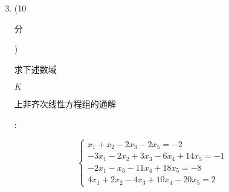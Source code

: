 \documentclass[10pt]{article}
\begin{document}
\begin{enumerate}
  \setcounter{enumi}{2}
  \item (10 \begin{CJK}{UTF8}{mj}分\end{CJK}) \begin{CJK}{UTF8}{mj}求下述数域\end{CJK} $K$ \begin{CJK}{UTF8}{mj}上非齐次线性方程组的通解\end{CJK}:
\end{enumerate}
$$
\left\{\begin{array}{l}
x_{1}+x_{2}-2 x_{3}-2 x_{5}=-2 \\
-3 x_{1}-2 x_{2}+3 x_{3}-6 x_{4}+14 x_{5}=-1 \\
-2 x_{1}-x_{3}-11 x_{4}+18 x_{5}=-8 \\
4 x_{1}+2 x_{2}-4 x_{3}+10 x_{4}-20 x_{5}=2
\end{array}\right.
$$
\end{document}
